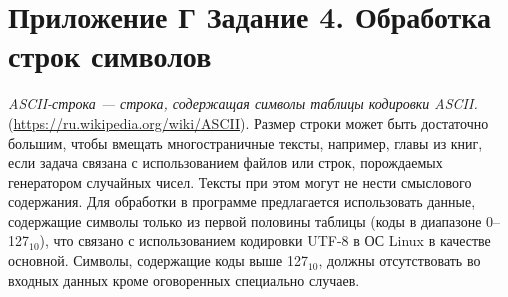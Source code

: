 \chapter*{Приложение Г Задание 4. Обработка строк символов}

\textit{ASCII-строка --- строка, содержащая символы таблицы кодировки ASCII.} (\url{https://ru.wikipedia.org/wiki/ASCII}). Размер строки может быть достаточно большим, чтобы вмещать многостраничные тексты, например, главы из книг, если задача связана с использованием файлов или строк, порождаемых генератором случайных чисел. Тексты при этом могут не нести смыслового содержания. Для обработки в программе предлагается использовать данные, содержащие символы только из первой половины таблицы (коды в диапазоне 0--127$_{10}$), что связано с использованием кодировки UTF-8 в ОС Linux в качестве основной. Символы, содержащие коды выше 127$_{10}$, должны отсутствовать во входных данных кроме оговоренных специально случаев.

